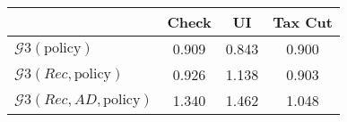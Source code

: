 \begin{tabular}{@{}lccc@{}}
\toprule
                          & Check      & UI    & Tax Cut    \\  \midrule
$\mathcal{G}3(\text{policy})$ & 0.909  & 0.843  & 0.900     \\
$\mathcal{G}3(Rec,\text{policy})$ & 0.926  & 1.138  & 0.903     \\
$\mathcal{G}3(Rec, AD,\text{policy})$ & 1.340  & 1.462  & 1.048     \\
\end{tabular}
